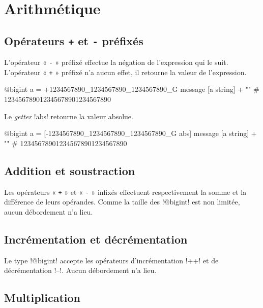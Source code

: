 \section{Arithmétique}


\subsection{Opérateurs \texttt{+} et \texttt{-} préfixés}

L'opérateur « \texttt{-} » préfixé effectue la négation de l'expression qui le suit. L'opérateur « \texttt{+} » préfixé n'a aucun effet, il retourne la valeur de l'expression.

\begin{galgas}
@bigint a = +1234567890_1234567890_1234567890_G
message [a string] + "\n" # 123456789012345678901234567890
\end{galgas}










Le \emph{getter} \ggs!abs! retourne la valeur absolue.

\begin{galgas}
@bigint a = [-1234567890_1234567890_1234567890_G abs]
message [a string] + "\n" # 123456789012345678901234567890
\end{galgas}






\subsection{Addition et soustraction}

Les opérateurs « \texttt{+} » et « \texttt{-} » infixés effectuent respectivement la somme et la différence de leurs opérandes. Comme la taille des \ggs!@bigint! est non limitée, aucun débordement n'a lieu.


\subsection{Incrémentation et décrémentation}

Le type \ggs!@bigint! accepte les opérateurs d'incrémentation \ggs!++! et de décrémentation \ggs!--!. Aucun débordement n'a lieu.

\subsection{Multiplication}

